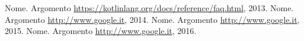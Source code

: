 \begin{thebibliography}{90}             %
\rhead[\fancyplain{}{\bfseries \leftmark}]{\fancyplain{}{\bfseries
\thepage}}
 Nome. Argomento \url{https://kotlinlang.org/docs/reference/faq.html}, 2013.
 Nome. Argomento \url{http://www.google.it}, 2014.
 Nome. Argomento \url{http://www.google.it}, 2015.
 Nome. Argomento \url{http://www.google.it}, 2016.

\end{thebibliography}
\clearpage{\pagestyle{empty}\cleardoublepage}
